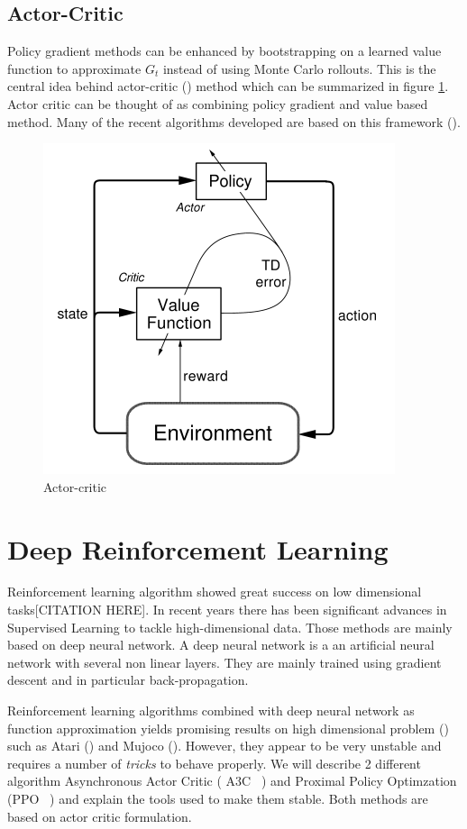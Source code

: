 \subsection{Actor-Critic}
Policy gradient methods can be enhanced by bootstrapping on a learned value function to approximate $G_t$ instead of using Monte Carlo rollouts. This is the central idea behind actor-critic (\citep{konda2000actor}) method which can be summarized in figure \ref{fig:actor_critic}. Actor critic can be thought of as combining policy gradient and value based method. Many of the recent algorithms developed are based on this framework (\citep{mnih2016asynchronous,schulman2017proximal,wu2017scalable}).
\begin{figure}
    \centering
    \includegraphics[scale=0.6]{fig/actor_critic.png}
    \caption{Actor-critic}
    \label{fig:actor_critic}
\end{figure}
\section{Deep Reinforcement Learning} %
Reinforcement learning algorithm showed great success on low dimensional tasks[CITATION HERE]. In recent years there has been significant advances in Supervised Learning to tackle high-dimensional data. Those methods are mainly based on deep neural network. A deep neural network is a an artificial neural network with several non linear layers. They are mainly trained using gradient descent and in particular back-propagation. 

Reinforcement learning algorithms combined with deep neural network as function approximation yields promising results on high dimensional problem (\citep{mnih2013playing,mnih2016asynchronous,schulman2017proximal}) such as Atari (\citep{bellemare2013arcade}) and Mujoco (\citep{todorov2012mujoco}). However, they appear to be very unstable and requires a number of \emph{tricks} to behave properly. We will describe 2 different algorithm Asynchronous Actor Critic ( A3C ~\citep{mnih2016asynchronous}) and Proximal Policy Optimzation (PPO ~\citep{schulman2017proximal}) and explain the tools used to make them stable. Both methods are based on actor critic formulation. 
